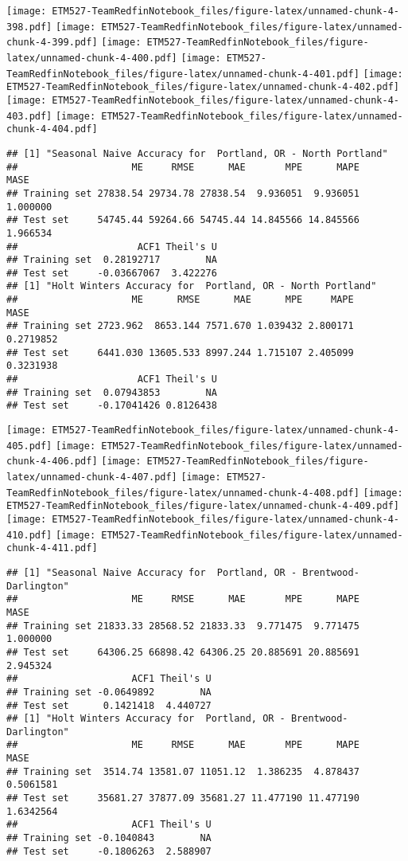 \documentclass[]{article}
\begin{document}
\texttt{[image: ETM527-TeamRedfinNotebook\_files/figure-latex/unnamed-chunk-4-398.pdf]}
\texttt{[image: ETM527-TeamRedfinNotebook\_files/figure-latex/unnamed-chunk-4-399.pdf]}
\texttt{[image: ETM527-TeamRedfinNotebook\_files/figure-latex/unnamed-chunk-4-400.pdf]}
\texttt{[image: ETM527-TeamRedfinNotebook\_files/figure-latex/unnamed-chunk-4-401.pdf]}
\texttt{[image: ETM527-TeamRedfinNotebook\_files/figure-latex/unnamed-chunk-4-402.pdf]}
\texttt{[image: ETM527-TeamRedfinNotebook\_files/figure-latex/unnamed-chunk-4-403.pdf]}
\texttt{[image: ETM527-TeamRedfinNotebook\_files/figure-latex/unnamed-chunk-4-404.pdf]}

\begin{verbatim}
## [1] "Seasonal Naive Accuracy for  Portland, OR - North Portland"
##                    ME     RMSE      MAE       MPE      MAPE     MASE
## Training set 27838.54 29734.78 27838.54  9.936051  9.936051 1.000000
## Test set     54745.44 59264.66 54745.44 14.845566 14.845566 1.966534
##                     ACF1 Theil's U
## Training set  0.28192717        NA
## Test set     -0.03667067  3.422276
## [1] "Holt Winters Accuracy for  Portland, OR - North Portland"
##                    ME      RMSE      MAE      MPE     MAPE      MASE
## Training set 2723.962  8653.144 7571.670 1.039432 2.800171 0.2719852
## Test set     6441.030 13605.533 8997.244 1.715107 2.405099 0.3231938
##                     ACF1 Theil's U
## Training set  0.07943853        NA
## Test set     -0.17041426 0.8126438
\end{verbatim}

\texttt{[image: ETM527-TeamRedfinNotebook\_files/figure-latex/unnamed-chunk-4-405.pdf]}
\texttt{[image: ETM527-TeamRedfinNotebook\_files/figure-latex/unnamed-chunk-4-406.pdf]}
\texttt{[image: ETM527-TeamRedfinNotebook\_files/figure-latex/unnamed-chunk-4-407.pdf]}
\texttt{[image: ETM527-TeamRedfinNotebook\_files/figure-latex/unnamed-chunk-4-408.pdf]}
\texttt{[image: ETM527-TeamRedfinNotebook\_files/figure-latex/unnamed-chunk-4-409.pdf]}
\texttt{[image: ETM527-TeamRedfinNotebook\_files/figure-latex/unnamed-chunk-4-410.pdf]}
\texttt{[image: ETM527-TeamRedfinNotebook\_files/figure-latex/unnamed-chunk-4-411.pdf]}

\begin{verbatim}
## [1] "Seasonal Naive Accuracy for  Portland, OR - Brentwood-Darlington"
##                    ME     RMSE      MAE       MPE      MAPE     MASE
## Training set 21833.33 28568.52 21833.33  9.771475  9.771475 1.000000
## Test set     64306.25 66898.42 64306.25 20.885691 20.885691 2.945324
##                    ACF1 Theil's U
## Training set -0.0649892        NA
## Test set      0.1421418  4.440727
## [1] "Holt Winters Accuracy for  Portland, OR - Brentwood-Darlington"
##                    ME     RMSE      MAE       MPE      MAPE      MASE
## Training set  3514.74 13581.07 11051.12  1.386235  4.878437 0.5061581
## Test set     35681.27 37877.09 35681.27 11.477190 11.477190 1.6342564
##                    ACF1 Theil's U
## Training set -0.1040843        NA
## Test set     -0.1806263  2.588907
\end{verbatim}
\end{document}
